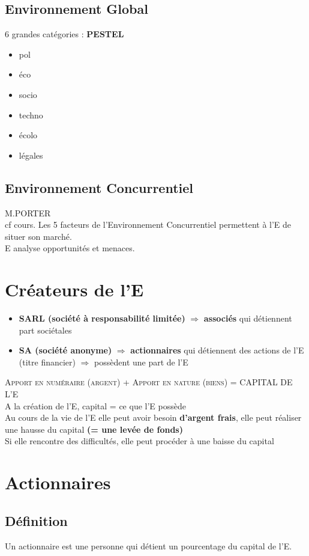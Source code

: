 \documentclass[a4paper,11pt]{report}
\begin{document}
\subsection{Environnement Global}
6 grandes catégories : \textbf{PESTEL}
\begin{itemize}
    \item pol
    \item éco
    \item socio
    \item techno
    \item écolo
    \item légales
\end{itemize}
\subsection{Environnement Concurrentiel}
\textsc{M.PORTER}\\
cf cours.
Les 5 facteurs de l'Environnement Concurrentiel permettent à l'E de situer son marché. \\
E analyse opportunités et menaces.
\section{Créateurs de l'E}
\begin{itemize}
    \item \textbf{SARL (société à responsabilité limitée)}  $\Rightarrow$ \textbf{associés} qui détiennent part sociétales
    \item \textbf{SA (société anonyme)} $\Rightarrow$ \textbf{actionnaires} qui détiennent des actions de l'E (titre financier) $\Rightarrow$ possèdent une part de l'E
\end{itemize}
\textsc{Apport en numéraire (argent) + Apport en nature (biens) = CAPITAL DE L'E} \\
A la création de l'E, capital = ce que l'E possède \\
Au cours de la vie de l'E elle peut avoir besoin \textbf{d'argent frais}, elle peut réaliser une hausse du capital \textbf{(= une levée de fonds)} \\
Si elle rencontre des difficultés, elle peut procéder à une baisse du capital
\section{Actionnaires}
\subsection{Définition}
Un actionnaire est une personne qui détient un pourcentage du capital de l'E.
\end{document}
